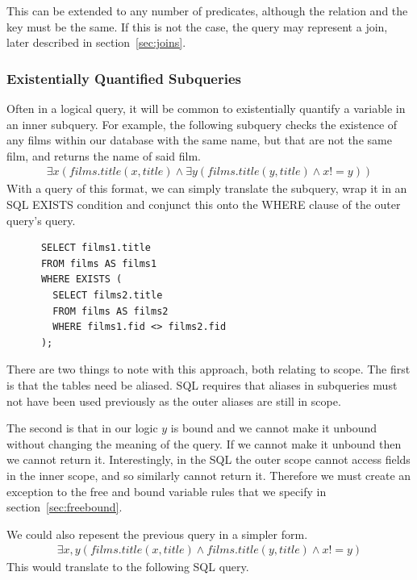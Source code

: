 \documentclass[a4paper, 11pt]{article}
\begin{document}
    This can be extended to any number of predicates, although the relation and
    the key must be the same. If this is not the case, the query may represent
    a join, later described in section~\ref{sec:joins}.

    \subsubsection{Existentially Quantified Subqueries}
    \label{sec:existential}
    Often in a logical query, it will be common to existentially quantify a
    variable in an inner subquery. For example, the following subquery checks
    the existence of any films within our database with the same name, but that
    are not the same film, and returns the name of said film.
    \begin{gather}
      \exists x(films.title(x, title) \land \exists y(films.title(y,
      title) \land x != y))
    \end{gather}
    With a query of this format, we can simply translate the subquery, wrap it
    in an SQL EXISTS condition and conjunct this onto the WHERE clause of the
    outer query's query.

    \begin{verbatim}
      SELECT films1.title
      FROM films AS films1
      WHERE EXISTS (
        SELECT films2.title
        FROM films AS films2
        WHERE films1.fid <> films2.fid
      );
    \end{verbatim}

    There are two things to note with this approach, both relating to scope.
    The first is that the tables need be aliased. SQL requires that aliases
    in subqueries must not have been used previously as the outer aliases are
    still in scope.
    
    The second is that in our logic $y$ is bound and we cannot make it unbound
    without changing the meaning of the query. If we cannot make it unbound
    then we cannot return it. Interestingly, in the SQL the outer scope cannot
    access fields in the inner scope, and so similarly cannot return it.
    Therefore we must create an exception to the free and bound variable rules
    that we specify in section~\ref{sec:freebound}.

    We could also repesent the previous query in a simpler form.
    \begin{gather}
      \exists x,y(films.title(x, title) \land films.title(y, title)
        \land x != y)
    \end{gather}
    This would translate to the following SQL query.
\end{document}
